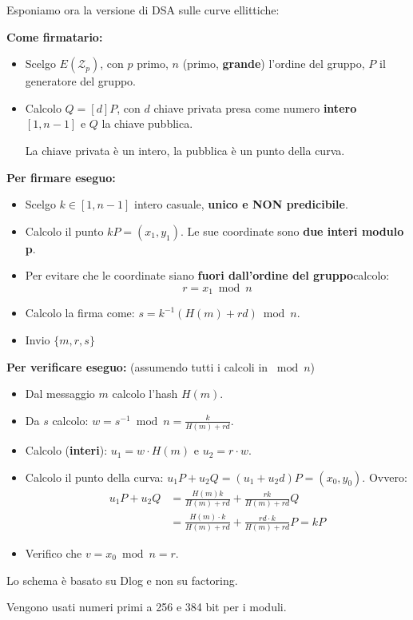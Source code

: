 Esponiamo ora la versione di DSA sulle curve ellittiche:
\begin{definition}\label{def:ecdsa}
\textbf{Come firmatario:}
\begin{itemize}
    \item Scelgo $E(\mathcal{Z}_p)$, con $p$ primo, $n$ (primo, \textbf{grande}) l'ordine del gruppo, $P$ il generatore del gruppo.
    \item Calcolo $Q=[d]P$, con $d$ chiave privata presa come numero \textbf{intero} $[1,n-1]$ e $Q$ la chiave pubblica.\\
    \begin{remark}
    La chiave privata è un intero, la pubblica è un punto della curva.
    \end{remark}
\end{itemize}
\textbf{Per firmare eseguo:}
\begin{itemize}
    \item Scelgo $k\in[1,n-1]$ intero casuale, \textbf{unico e NON predicibile}.
    \item Calcolo il punto $kP=(x_1,y_1)$. Le sue coordinate sono \textbf{due interi modulo p}.
    \item Per evitare che le coordinate siano \textbf{fuori dall'ordine del gruppo}\footnotemark calcolo:
    \[r=x_1\bmod n\]
    \item Calcolo la firma come: $s=k^{-1}(H(m)+rd)\bmod{n}$.
    \item Invio $\{m,r,s\}$
\end{itemize}
\textbf{Per verificare eseguo:} (assumendo tutti i calcoli in $\bmod{n}$)
\begin{itemize}
    \item Dal messaggio $m$ calcolo l'hash $H(m)$.
    \item Da $s$ calcolo: $w=s^{-1}\bmod n=\frac{k}{H(m)+rd}$.
    \item Calcolo (\textbf{interi}): $u_1=w\cdot H(m)$ e $u_2=r\cdot w$.
    \item Calcolo il punto della curva: $u_1P+u_2Q=(u_1+u_2d)P=(x_0,y_0)$. Ovvero:
    \begin{equation*}
        \begin{aligned}
            u_1P+u_2Q&=\frac{H(m)k}{H(m)+rd}+\frac{rk}{H(m)+rd}Q\\
            &=\frac{H(m)\cdot k}{H(m)+rd}+\frac{rd\cdot k}{H(m)+rd}P=kP
        \end{aligned}
    \end{equation*}
    \item Verifico che $v=x_0\bmod n=r$.
\end{itemize}
\begin{remark}
Lo schema è basato su Dlog e non su factoring.
\end{remark}
Vengono usati numeri primi a 256 e 384 bit per i moduli.
\end{definition}
